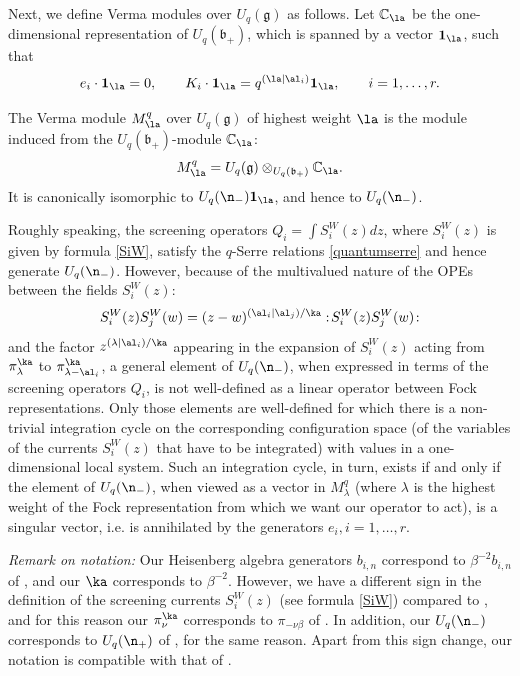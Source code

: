 \documentclass{amsart}
\newcommand{\+}{\mathop{\oplus}}
\renewcommand{\*}{{\otimes}}
\newcommand{\mf}{\mathfrak}
\newcommand{\g}{\mf{g}}
\newcommand{\C}{\mathbb{C}}
\newcommand{\lam}{\lambda}
\def\b{{\mathfrak b}}
\theoremstyle{theorem}
\theoremstyle{remark}
\numberwithin{equation}{section}
\begin{document}
Next, we define Verma modules over $U_q(\g)$ as follows. Let $\C_\la$
be the one-dimensional representation of $U_q(\b_+)$, which is spanned
by a vector ${\mathbf 1}_\la$, such that $$e_i \cdot {\mathbf 1}_\la =
0, \quad \quad K_i \cdot {\mathbf 1}_\la = q^{(\la|\al_i)} {\mathbf
  1}_\la, \quad \quad i=1,\dots,r.$$

The Verma module $M_\la^q$ over $U_q(\g)$ of highest weight $\la$ is
the module induced from the $U_q(\b_+)$-module
$\C_\la$: $$M_\la^q = U_q(\g) \otimes_{U_q(\b_+)} \C_\la.$$
It is canonically isomorphic to $U_q(\n_-) {\mathbf 1}_\la$, and hence to
$U_q(\n_-)$.

Roughly speaking, the screening operators $Q_i = \int S^W_i(z) dz$,
where $S^W_i(z)$ is given by formula \eqref{SiW}, satisfy the
$q$-Serre relations \eqref{quantumserre} and hence generate
$U_q(\n_-)$. However, because of the multivalued nature of the OPEs
between the fields $S^W_i(z)$:
$$
S^W_i(z) S^W_j(w) = (z-w)^{(\al_i|\al_j)/\ka} : \! S^W_i(z) S^W_j(w)
\! :
$$
and the factor $z^{(\lam|\al_i)/\ka}$ appearing in the expansion of
$S^W_i(z)$ acting from $\pi^\ka_\lam$ to $\pi^\ka_{\lam-\al_i}$, a general
element of $U_q(\n_-)$, when expressed in terms of the screening
operators $Q_i$, is not well-defined as a linear operator between Fock
representations. Only those elements are well-defined for which there
is a non-trivial integration cycle on the corresponding configuration
space (of the variables of the currents $S^W_i(z)$ that have to be
integrated) with values in a one-dimensional local system. Such an
integration cycle, in turn, exists if and only if the element of
$U_q(\n_-)$, when viewed as a vector in $M^q_\lam$ (where $\lam$ is
the highest weight of the Fock representation from which we want our
operator to act), is a singular vector, i.e. is annihilated by the
generators $e_i, i=1,\dots,r$.

\medskip

{\em Remark on notation:} Our Heisenberg algebra generators $b_{i,n}$
correspond to $\beta^{-2} b_{i,n}$ of \cite{FF93}, and our $\ka$
corresponds to $\beta^{-2}$. However, we have a different sign in the
definition of the screening currents $S^W_i(z)$ (see formula
\eqref{SiW}) compared to \cite{FF93}, and for this reason our
$\pi^\ka_\nu$ corresponds to $\pi_{-\nu \beta}$ of \cite{FF93}. In
addition, our $U_q(\n_-)$ corresponds to $U_q(\n_+)$ of \cite{FF93},
for the same reason. Apart from this sign change, our notation is
compatible with that of \cite{FF93}.

\medskip
\end{document}
